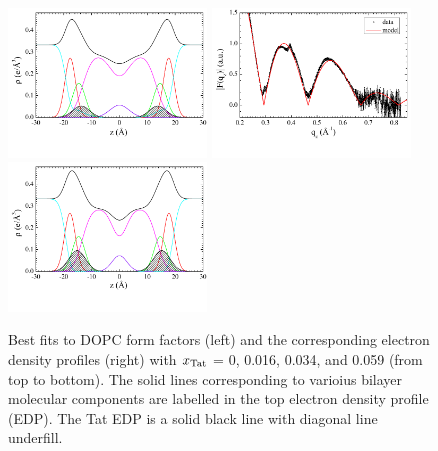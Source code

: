 \begin{figure}[htbp]
  \includegraphics[trim=5 30 0 0,clip=true,width=0.47\textwidth]{figures/Tat/SDP_Results/EDP/DOPC_Tat_28to1_3p0_EDP1}
  \includegraphics[trim=5 30 0 0,clip=true,width=0.47\textwidth]{figures/Tat/SDP_Results/XFF/DOPC_Tat_16to1_3p0_XFF1}
  \includegraphics[trim=5 30 0 0,clip=true,width=0.47\textwidth]{figures/Tat/SDP_Results/EDP/DOPC_Tat_16to1_3p0_EDP1}
  \caption{Best fits to DOPC form factors (left) and the corresponding 
  electron density profiles (right) with $x_\textrm{Tat}$ = 0, 0.016, 0.034, 
  and 0.059 (from top to bottom).
  The solid lines corresponding to varioius bilayer molecular components are 
  labelled in the top electron density profile (EDP). The Tat EDP is a solid black
  line with diagonal line underfill.}
  \label{fig:DOPC_Tat_XFF1}
\end{figure}

